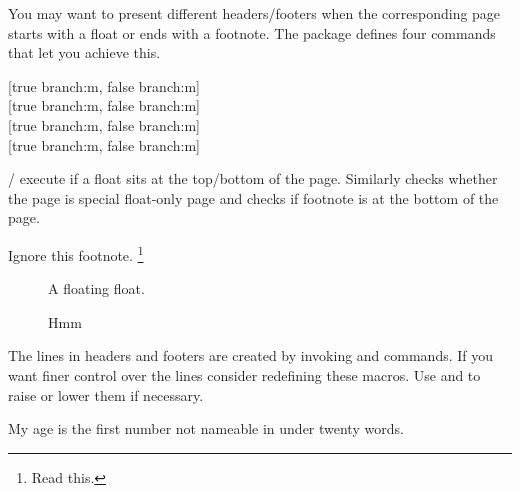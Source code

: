 You may want to present different headers\slash{}footers when the corresponding
page starts with a float or ends with a footnote. The  package
defines four commands that let you achieve this.
\begin{lscommand}
  [true branch:m, false branch:m] \\
  [true branch:m, false branch:m] \\
  [true branch:m, false branch:m] \\
  [true branch:m, false branch:m]
\end{lscommand}
/ execute  if a float sits at
the top\slash{}bottom of the page. Similarly  checks whether
the page is special float-only page and  checks if footnote is
at the bottom of the page.
\begin{example}[standalone, paperheight=4cm, to_page=2, vertical_pages]
\geometry{includehead, includefoot, headsep=.5em, footskip=1em} %
\sloppy %
\usepackage{fancyhdr}%
\usepackage{extramarks}%
\pagestyle{fancy}%


\noindent %
Ignore this footnote.%
\footnote{Read this.}
\begin{figure}[t]
  \centering
  A floating float.
  \caption{Hmm}
\end{figure}
\end{example}

The lines in headers and footers are created by invoking  and
 commands. If you want finer control over the lines consider
redefining these macros. Use  and  to raise
or lower them if necessary.
\begin{example}[standalone, paperheight=4cm, paperwidth=3.2cm]
\geometry{includehead, includefoot, headsep=.5em, footskip=1em} %
\sloppy %
\usepackage{fancyhdr}%
\usepackage{extramarks}%
\pagestyle{fancy}%
\RenewDocumentCommand{\headrule}{}{
  \rule{0.05\headwidth}{0.2cm}%
  \rule[0.1cm]{0.9\headwidth}{\headrulewidth}%
  \rule{0.05\headwidth}{0.2cm}%
}

\RenewDocumentCommand{\headruleskip}{}{-0.2cm}

\noindent %
My age is the first number not
nameable in under twenty words.
\end{example}

